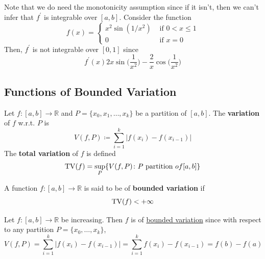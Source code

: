   \begin{example}
    \label{ex:continuous-but-not-monotone}
    Note that we do need the monotonicity assumption since if it isn't, then we can't infer that $f^\prime$ is integrable over $[a, b]$. Consider the function 
    \begin{equation}
      f(x) = \begin{cases} 
        x^2 \sin(1/x^2) & \text{ if } 0 < x \leq 1 \\ 
        0 & \text{ if } x = 0
      \end{cases}
    \end{equation}
    Then, $f^\prime$ is not integrable over $[0, 1]$ since 
    \begin{equation}
      f^\prime (x) 2 x \sin \Big( \frac{1}{x^2} \Big) - \frac{2}{x} \cos \Big( \frac{1}{x^2} \Big)
    \end{equation}
  \end{example}

\subsection{Functions of Bounded Variation} 

  \begin{definition}
    \label{def:total-variation}
    Let $f: [a, b] \to \mathbb{R}$ and $P = \{x_0, x_1, \ldots, x_k \}$ be a partition of $[a, b]$. The \textbf{variation} of $f$ w.r.t. $P$ is 
    \begin{equation}
      V(f, P) \coloneqq \sum_{i=1}^k |f(x_i) - f(x_{i-1})|
    \end{equation}
    The \textbf{total variation} of $f$ is defined 
    \begin{equation}
      \operatorname{TV}(f) = \sup_P \{ V(f, P) \colon P \text{ partition } of [a, b] \}
    \end{equation}
  \end{definition}

  \begin{definition}
    \label{def:bounded-variation}
    A function $f: [a, b] \to \mathbb{R}$ is said to be of \textbf{bounded variation} if 
    \begin{equation}
      \operatorname{TV}(f) < +\infty
    \end{equation}
  \end{definition}

  \begin{example}
    \label{ex:increasing-functions-are-of-bounded-variation}
    Let $f: [a, b] \to \mathbb{R}$ be increasing. Then $f$ is of \hyperref[def:bounded-variation]{bounded variation} since with respect to any partition $P = \{x_0, \ldots, x_k\}$, 
    \begin{equation}
      V(f, P) = \sum_{i=1}^k |f(x_i) - f(x_{i-1})| = \sum_{i=1}^k f(x_i) - f(x_{i-1}) = f(b) - f(a)
    \end{equation}
  \end{example}

